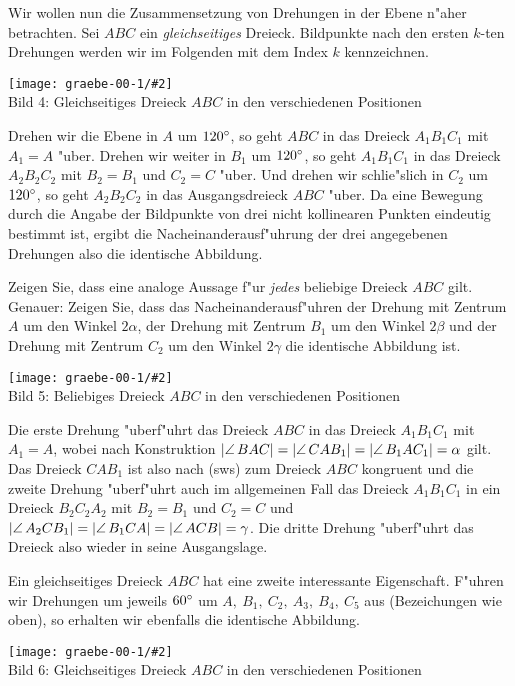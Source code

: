 \documentclass[11pt]{article}
\newcommand{\Bild}[3]{
\begin{center}
\texttt{[image: graebe-00-1/\#2]}\nopagebreak\\[12pt] #3
\end{center}
}
\begin{document}
Wir wollen nun die Zusammensetzung von Drehungen in der Ebene n"aher
betrachten. Sei $ABC$ ein {\em gleichseitiges} Dreieck. Bildpunkte nach den
ersten $k$-ten Drehungen werden wir im Folgenden mit dem Index $k$
kennzeichnen.

\Bild{width=12cm}{Bild4}{Bild 4: Gleichseitiges Dreieck $ABC$ in
den verschiedenen Positionen}

Drehen wir die Ebene in $A$ um $120^{\circ}$, so geht $ABC$ in das Dreieck
$A_1B_1C_1$ mit $A_1=A$ "uber.  Drehen wir weiter in $B_1$ um $120^{\circ}$, so
geht $A_1B_1C_1$ in das Dreieck $A_2B_2C_2$ mit $B_2=B_1$ und $C_2=C$ "uber.
Und drehen wir schlie"slich in $C_2$ um $120^{\circ}$, so geht $A_2B_2C_2$ in das
Ausgangsdreieck $ABC$ "uber. Da eine Bewegung durch die Angabe der Bildpunkte
von drei nicht kollinearen Punkten eindeutig bestimmt ist, ergibt die
Nacheinanderausf"uhrung der drei angegebenen Drehungen also die identische
Abbildung.

\begin{aufgabe}
  Zeigen Sie, dass eine analoge Aussage f"ur {\em jedes} beliebige Dreieck
  $ABC$ gilt. Genauer: Zeigen Sie, dass das Nacheinanderausf"uhren der Drehung
  mit Zentrum $A$ um den Winkel $2\alpha$, der Drehung mit Zentrum $B_1$ um
  den Winkel $2\beta$ und der Drehung mit Zentrum $C_2$ um den Winkel
  $2\gamma$ die identische Abbildung ist.
\end{aufgabe}

\Bild{width=12cm}{Bild5}{Bild 5: Beliebiges Dreieck $ABC$ in den
verschiedenen Positionen}

Die erste Drehung "uberf"uhrt das Dreieck $ABC$ in das Dreieck $A_1B_1C_1$ mit
$A_1=A$, wobei nach Konstruktion $\mangle{BAC}= \mangle{CAB_1}=
\mangle{B_1AC_1} =\alpha$ gilt. Das Dreieck $CAB_1$ ist also nach (sws) zum
Dreieck $ABC$ kongruent und die zweite Drehung "uberf"uhrt auch im allgemeinen
Fall das Dreieck $A_1B_1C_1$ in ein Dreieck $B_2C_2A_2$ mit $B_2=B_1$ und
$C_2=C$ und $\mangle{A_2CB_1}= \mangle{B_1CA}= \mangle{ACB} =\gamma$.  Die
dritte Drehung "uberf"uhrt das Dreieck also wieder in seine Ausgangslage.
\medskip

Ein gleichseitiges Dreieck $ABC$ hat eine zweite interessante Eigenschaft.
F"uhren wir Drehungen um jeweils $60^{\circ}$ um $A,\ B_1,\ C_2,\ A_3,\ B_4,\ 
C_5$ aus (Bezeichungen wie oben), so erhalten wir ebenfalls die identische
Abbildung.

\Bild{width=12cm}{Bild6}{Bild 6: Gleichseitiges Dreieck $ABC$ in den
  verschiedenen Positionen}
\end{document}
